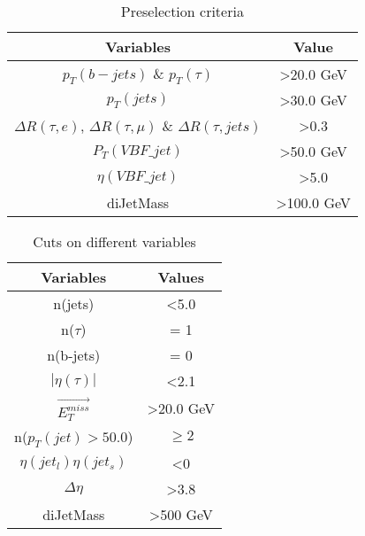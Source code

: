 \begin{table}[h]
\centering
\caption{Preselection criteria}
\label{preselection_table}
\begin{tabular}{|c|c|}
\hline
Variables                                                                & Value                 \\ \hline
$p_T(b-jets)$ \& $p_T(\tau)$                                            & \textgreater 20.0 GeV \\ \hline
$p_T(jets)$                                                             & \textgreater 30.0 GeV  \\ \hline
$\Delta R (\tau, e)$, $\Delta R (\tau, \mu)$ \& $\Delta R (\tau, jets)$ & \textgreater 0.3      \\ \hline
$P_T(VBF\_jet)$                                                          & \textgreater 50.0 GeV \\ \hline
$\eta(VBF\_jet)$                                                         & \textgreater5.0       \\ \hline
diJetMass                                                               & \textgreater100.0 GeV \\ \hline
\end{tabular}
\end{table}


\begin{table}[h]
\centering
\caption{Cuts on different variables}
\label{Cuts_variables}
\begin{tabular}{|c|c|}
\hline
Variables                & Values                \\ \hline
n(jets)                  & \textless 5.0         \\ \hline
n($\tau$)                & = 1                   \\ \hline
n(b-jets)                & = 0                   \\ \hline
$|\eta(\tau)|$           & \textless 2.1         \\ \hline
$\vec{E_T^{miss}}$       & \textgreater 20.0 GeV \\ \hline
n($p_T(jet) > 50.0$)     & $\geq 2$              \\ \hline
$\eta(jet_l)\eta(jet_s)$ & \textless0            \\ \hline
$\Delta \eta$            & \textgreater3.8       \\ \hline
diJetMass                & \textgreater500 GeV    \\ \hline
\end{tabular}
\end{table}


